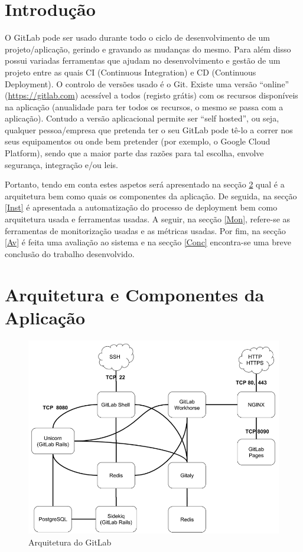 \documentclass{article}
\begin{document}
\section{Introdução}
O GitLab pode ser usado durante todo o ciclo de desenvolvimento de um projeto/aplicação, gerindo e gravando as mudanças do mesmo. Para além disso possui variadas ferramentas que ajudam no desenvolvimento e gestão de um projeto entre as quais CI (Continuous Integration) e CD (Continuous Deployment). O controlo de versões usado é o Git. Existe uma versão ``online'' (\url{https://gitlab.com}) acessível a todos (registo grátis) com os recursos disponíveis na aplicação (anualidade para ter todos os recursos, o mesmo se passa com a aplicação). Contudo a versão aplicacional permite ser ``self hosted'', ou seja, qualquer pessoa/empresa que pretenda ter o seu GitLab pode tê-lo a correr nos seus equipamentos ou onde bem pretender (por exemplo, o Google Cloud Platform), sendo que a maior parte das razões para tal escolha, envolve segurança, integração e/ou leis.
\par Portanto, tendo em conta estes aspetos será apresentado na secção \ref{Arq} qual é a arquitetura bem como quais os componentes da aplicação. De seguida, na secção \ref{Inst} é apresentada a automatização do processo de deployment bem como arquitetura usada e ferramentas usadas. A seguir, na secção \ref{Mon}, refere-se as ferramentas de monitorização usadas e as métricas usadas. Por fim, na secção \ref{Av} é feita uma avaliação ao sistema e na secção \ref{Conc} encontra-se uma breve conclusão do trabalho desenvolvido.

\section{Arquitetura e Componentes da Aplicação} \label{Arq}

\begin{figure}[H]
    \centering
    \includegraphics[width=15cm]{arch.png}
    \caption{Arquitetura do GitLab}
    \label{fig:arch}
\end{figure}
\end{document}
